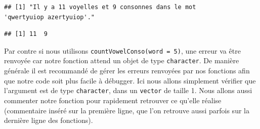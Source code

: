 \documentclass[twoside,symmetric]{book}
\newenvironment{Shaded}{}{}
\newcommand{\ControlFlowTok}[1]{\textbf{#1}}
\newcommand{\DataTypeTok}[1]{\underline{#1}}
\newcommand{\DecValTok}[1]{#1}
\newcommand{\KeywordTok}[1]{\textbf{#1}}
\newcommand{\NormalTok}[1]{#1}
\newcommand{\OperatorTok}[1]{#1}
\newcommand{\StringTok}[1]{#1}
\begin{document}
\begin{Shaded}
\end{Shaded}

\begin{verbatim}
## [1] "Il y a 11 voyelles et 9 consonnes dans le mot
'qwertyuiop azertyuiop'."
\end{verbatim}

\begin{verbatim}
## [1] 11  9
\end{verbatim}

Par contre si nous utilisons \texttt{countVowelConso(word\ =\ 5)}, une erreur va être renvoyée car notre fonction attend un objet de type \texttt{character}. De manière générale il est recommandé de gérer les erreurs renvoyées par nos fonctions afin que notre code soit plus facile à débugger. Ici nous allons simplement vérifier que l'argument est de type \texttt{character}, dans un \texttt{vector} de taille 1. Nous allons aussi commenter notre fonction pour rapidement retrouver ce qu'elle réalise (commentaire inséré sur la première ligne, que l'on retrouve aussi parfois sur la dernière ligne des fonctions).
\end{document}

